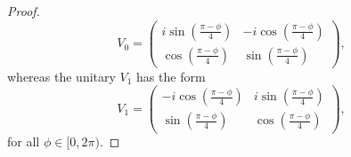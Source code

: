 \documentclass[preprint,12pt, a4paper, dvipsnames]{elsarticle}
\newcommand{\1}{{\rm 1\hspace{-0.9mm}l}}
\begin{document}
\begin{proof}
	\begin{equation}
	V_0 = \left(
	\begin{array}{cc}i \sin\left( \frac{\pi - \phi}{4} \right)&-i
	\cos\left( \frac{\pi - \phi}{4} \right)\\ \cos\left( \frac{\pi -
		\phi}{4}\right)& \sin\left( \frac{\pi - \phi}{4} \right)
	\end{array}
	\right),
	\end{equation}
	whereas the unitary  $V_1$  has the form
	\begin{equation}
	V_1 = \left(\begin{array}{cc}-i \cos\left(\frac{\pi - \phi}{4}\right) &i
	\sin\left( \frac{\pi - \phi}{4}\right)\\\sin\left( \frac{\pi - \phi}{4}
	\right) &  \cos\left( \frac{\pi - \phi}{4} \right) \end{array}\right),
	\end{equation}
	for all $\phi \in [0,2\pi)$.
\end{proof}
\end{document}

